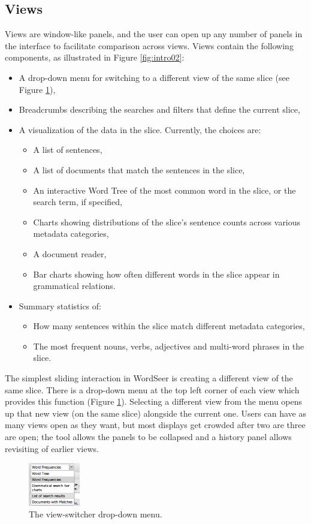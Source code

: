 \documentclass{sig-alternate}
\begin{document}
\begin{enumerate}
\subsection{Views}
Views  are window-like panels, and the user can open up any number of panels in the interface to facilitate comparison across views.  Views contain the following components, as illustrated in Figure \ref{fig:intro02}:
\begin{itemize}
	\item A drop-down menu for switching to a different view of the same slice (see Figure \ref{fig:chris03}),
	\item Breadcrumbs describing the searches and filters that define the current slice,
	\item A visualization of the data in the slice. Currently, the choices are:
		\begin{itemize}
			\item A list of sentences,
			\item A list of documents that match the sentences in the slice,
			\item An interactive Word Tree \cite{wattenberg_word_2008} of the most common word in the slice, or the search term, if specified,
			\item Charts showing distributions of the slice's sentence counts across various metadata categories,
			\item A document reader,
			\item Bar charts showing how often different words in the slice  appear in grammatical relations.
		\end{itemize}
	\item Summary statistics of:
		\begin{itemize}
			\item How many sentences within the slice match different metadata categories,
			\item The most frequent nouns, verbs, adjectives and multi-word phrases in the slice.
		\end{itemize}
\end{itemize}

The simplest sliding interaction in WordSeer is creating a different view of the same slice.  There is a drop-down menu at the top left corner of each view which provides this function (Figure \ref{fig:chris03}).  Selecting a different view from the menu opens up that new view (on the same slice) alongside the current one. Users can have as many views open as they want, but most displays get crowded after two are three are open; the tool allows the panels to be collapsed and a history panel allows revisiting of earlier views.  
\begin{figure}[h!]
\includegraphics[width=0.2\textwidth]{fig/chris/03.png}
\caption{ The view-switcher drop-down menu.\label{fig:chris03}}
\end{figure}



\end{enumerate}
\end{document}
